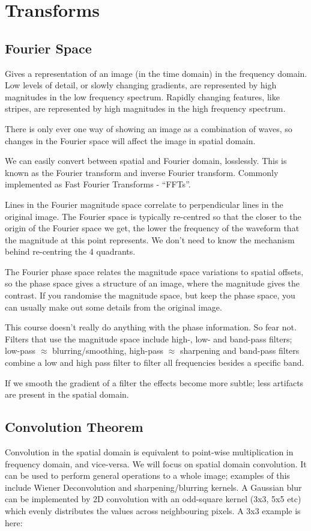 \documentclass{article}
\begin{document}
\section{Transforms}

    \subsection{Fourier Space}    
        Gives a representation of an image (in the time domain) in the frequency domain. Low levels of detail, or slowly changing gradients, are represented by high magnitudes in the low frequency spectrum. Rapidly changing features, like stripes, are represented by high magnitudes in the high frequency spectrum.
        
        There is only ever one way of showing an image as a combination of waves, so changes in the Fourier space will affect the image in spatial domain.
        
        We can easily convert between spatial and Fourier domain, losslessly. This is known as the Fourier transform and inverse Fourier transform. Commonly implemented as Fast Fourier Transforms - ``FFTs''.
        
        Lines in the Fourier magnitude space correlate to perpendicular lines in the original image. The Fourier space is typically re-centred so that the closer to the origin of the Fourier space we get, the lower the frequency of the waveform that the magnitude at this point represents. We don't need to know the mechanism behind re-centring the 4 quadrants.
        
        The Fourier phase space relates the magnitude space variations to spatial offsets, so the phase space gives a structure of an image, where the magnitude gives the contrast. If you randomise the magnitude space, but keep the phase space, you can usually make out some details from the original image.
        
        This course doesn't really do anything with the phase information. So fear not. Filters that use the magnitude space include high-, low- and band-pass filters; low-pass $\approx$ blurring/smoothing, high-pass $\approx$ sharpening and band-pass filters combine a low and high pass filter to filter all frequencies besides a specific band.
        
        If we smooth the gradient of a filter the effects become more subtle; less artifacts are present in the spatial domain. 
    
    \subsection{Convolution Theorem}
        Convolution in the spatial domain is equivalent to point-wise multiplication in frequency domain, and vice-versa. We will focus on spatial domain convolution. It can be used to perform general operations to a whole image; examples of this include Wiener Deconvolution and sharpening/blurring kernels. A Gaussian blur can be implemented by 2D convolution with an odd-square kernel (3x3, 5x5 etc) which evenly distributes the values across neighbouring pixels. A 3x3 example is here:
        
\end{document}
